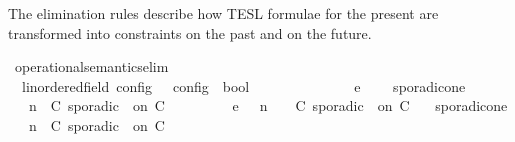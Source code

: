 \begin{isabellebody}
\begin{isamarkuptext}%
The elimination rules describe how TESL formulae for the present are transformed 
  into constraints on the past and on the future.%
\end{isamarkuptext}\isamarkuptrue%
\isamarkupfalse%
\ operational{\isacharunderscore}semantics{\isacharunderscore}elim\isanewline
\ \ {\isacharcolon}{\isacharcolon}{\isacartoucheopen}{\isacharparenleft}{\isacharprime}{\isasymtau}{\isacharcolon}{\isacharcolon}linordered{\isacharunderscore}field{\isacharparenright}\ config\ {\isasymRightarrow}\ {\isacharprime}{\isasymtau}\ config\ {\isasymRightarrow}\ bool{\isacartoucheclose}\ \ \ \ \ \ \ \ \ \ \ \ \ \ {\isacharparenleft}{\isacartoucheopen}{\isacharunderscore}\ {\isasymhookrightarrow}\isactrlsub e\ {\isacharunderscore}{\isacartoucheclose}\ {}{}{\isacharparenright}\isanewline
{}\isanewline
\ \ sporadic{\isacharunderscore}on{\isacharunderscore}e{}{\isacharcolon}\isanewline
%
\isanewline
\ \ {\isacartoucheopen}{\isacharparenleft}{\isasymGamma}{\isacharcomma}\ n\ {\isasymturnstile}\ {\isacharparenleft}{\isacharparenleft}C\ sporadic\ {\isasymtau}\ on\ C\ {\isacharhash}\ {\isasymPsi}{\isacharparenright}\ {\isasymtriangleright}\ {\isasymPhi}{\isacharparenright}\isanewline
\ \ \ \ \ {\isasymhookrightarrow}\isactrlsub e\ \ {\isacharparenleft}{\isasymGamma}{\isacharcomma}\ n\ {\isasymturnstile}\ {\isasymPsi}\ {\isasymtriangleright}\ {\isacharparenleft}{\isacharparenleft}C\ sporadic\ {\isasymtau}\ on\ C\ {\isacharhash}\ {\isasymPhi}{\isacharparenright}{\isacharparenright}{\isacartoucheclose}\isanewline
{\isacharbar}\ sporadic{\isacharunderscore}on{\isacharunderscore}e{}{\isacharcolon}\isanewline
%
\isanewline
\ \ {\isacartoucheopen}{\isacharparenleft}{\isasymGamma}{\isacharcomma}\ n\ {\isasymturnstile}\ {\isacharparenleft}{\isacharparenleft}C\ sporadic\ {\isasymtau}\ on\ C\ {\isacharhash}\ {\isasymPsi}{\isacharparenright}\ {\isasymtriangleright}\ {\isasymPhi}{\isacharparenright}\isanewline

\end{isabellebody}
